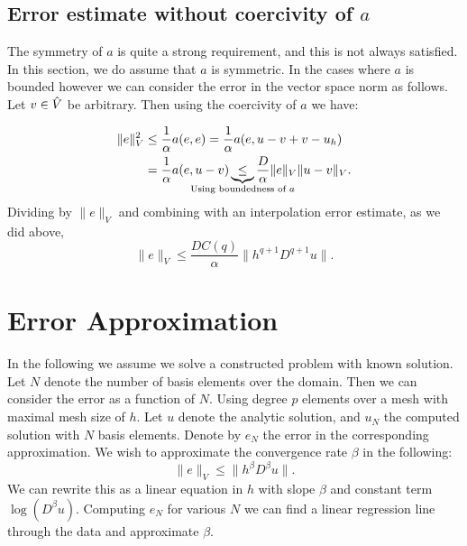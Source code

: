 \subsection{Error estimate without coercivity of \(a\)}
\label{ssec:error_estimate_cea}
The symmetry of \( a \) is quite a strong requirement, and this is not always
satisfied. In this section, we do  assume that \( a \) is symmetric.
In the cases where \( a \) is bounded however we can consider the error in the
vector space norm as follows. Let \( v \in \hat{V} \) be arbitrary. Then using
the coercivity of \( a \) we have:

\begin{align}
    \| e \|_V^2 &\leq \frac{1}{\alpha} a(e, e) = \frac{1}{\alpha}a(e, u- v + v - u_h) \\
                &= \frac{1}{\alpha} a(e, u - v)
                \underbrace{\leq}_{\mathclap{\text{Using boundedness of \(a
        \)}}} \frac{D}{\alpha}\| e \|_V \| u - v \|_V.
\end{align}
Dividing by \( \|e\|_V \) and combining with an interpolation error estimate,
as we did above, 
\begin{equation}
    \|e \|_V \leq \frac{D C(q)}{\alpha} \|h^{q+1} D^{q+1}u \|.
\end{equation}

\section{Error Approximation}

In the following we assume we solve a constructed problem with known solution.
Let \( N \) denote the number of basis elements over the domain. Then we can
consider the error as a function of \( N \). Using degree \( p \) elements over
a mesh with maximal mesh size of \( h \). Let \( u \) denote the analytic
solution, and \( u_N \) the computed solution with \( N \) basis elements.
Denote by \( e_N \) the error in the corresponding approximation.
We wish to approximate the convergence rate \( \beta \) in the following:
\begin{equation}
    \| e \|_V \leq \| h^\beta D^\beta u \|.
\end{equation}
We can rewrite this as a linear equation in \( h \) with slope \(\beta\) and
constant term \( \log(D^\beta u) \). Computing \( e_N \) for various \( N \) we
can find a linear regression line through the data and approximate \( \beta \).

